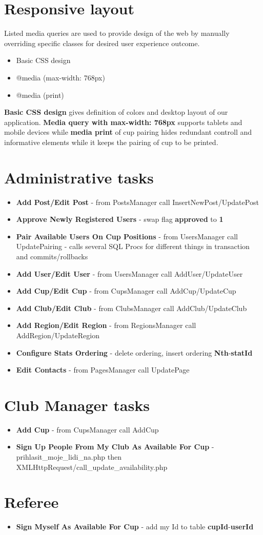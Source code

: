 \section{Responsive layout}
Listed media queries are used to provide design of the web by manually overriding specific classes for desired user experience outcome.
\begin{itemize}
    \item Basic CSS design
    \item @media (max-width: 768px)
    \item @media (print)
\end{itemize}
\textbf{Basic CSS design} gives definition of colors and desktop layout of our application. \textbf{Media query with max-width: 768px} supports tablets and mobile devices while \textbf{media print} of cup pairing hides redundant controll and informative elements while it keeps the pairing of cup to be printed.
\section{Administrative tasks}
\begin{itemize}
    \item \textbf{Add Post/Edit Post} - from PostsManager call \newline InsertNewPost/UpdatePost
    \item \textbf{Approve Newly Registered Users} - swap flag \textbf{approved} to \textbf{1}
    \item \textbf{Pair Available Users On Cup Positions} - from UsersManager call UpdatePairing - calls several SQL Procs for different things in transaction and commits/rollbacks
    \item \textbf{Add User/Edit User} - from UsersManager call AddUser/UpdateUser
    \item \textbf{Add Cup/Edit Cup} - from CupsManager call AddCup/UpdateCup
    \item \textbf{Add Club/Edit Club} - from ClubsManager call AddClub/UpdateClub
    \item \textbf{Add Region/Edit Region} - from RegionsManager call AddRegion/UpdateRegion
    \item \textbf{Configure Stats Ordering} - delete ordering, insert ordering \textbf{Nth}-\textbf{statId} 
    \item \textbf{Edit Contacts} - from PagesManager call UpdatePage
\end{itemize} 
\section{Club Manager tasks}
\begin{itemize}
    \item \textbf{Add Cup} - from CupsManager call AddCup
    \item \textbf{Sign Up People From My Club As Available For Cup} - prihlasit\_moje\_lidi\_na.php then XMLHttpRequest/call\_update\_availability.php
\end{itemize}   
\section{Referee}    
\begin{itemize}
    \item \textbf{Sign Myself As Available For Cup} - add my Id to table \textbf{cupId}-\textbf{userId}
\end{itemize}